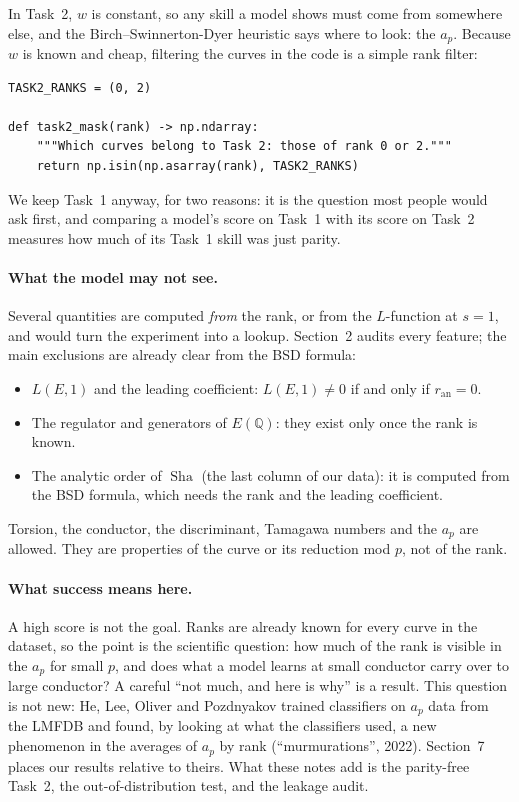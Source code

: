\documentclass[11pt]{article}
\theoremstyle{definition}
\theoremstyle{plain}
\theoremstyle{remark}
\newcommand{\Q}{\mathbb{Q}}
\renewcommand{\_}{\oldunderscore\allowbreak}
\newcommand{\file}[1]{\textcolor{blue!50!black}{\texttt{#1}}}
\DeclareMathOperator{\Sha}{Sha}
\newcommand{\codefrom}[1]{\par\smallskip\noindent{\footnotesize\textbf{From} \file{#1}}}
\begin{document}
\noindent In Task~2, $w$ is constant, so any skill a model shows must come from somewhere
else, and the Birch--Swinnerton-Dyer heuristic says where to look: the $a_p$. Because $w$ is
known and cheap, filtering the curves in the code is a simple rank filter:

\codefrom{src/eclab/tasks.py}
\begin{lstlisting}
TASK2_RANKS = (0, 2)

def task2_mask(rank) -> np.ndarray:
    """Which curves belong to Task 2: those of rank 0 or 2."""
    return np.isin(np.asarray(rank), TASK2_RANKS)
\end{lstlisting}

\noindent We keep Task~1 anyway, for two reasons: it is the question most people would ask
first, and comparing a model's score on Task~1 with its score on Task~2 measures how much of
its Task~1 skill was just parity.

\paragraph{What the model may not see.}
Several quantities are computed \emph{from} the rank, or from the $L$-function at $s=1$,
and would turn the experiment into a lookup. Section~2 audits every feature; the main
exclusions are already clear from the BSD formula:
\begin{itemize}[nosep]
  \item $L(E,1)$ and the leading coefficient: $L(E,1)\neq0$ if and only if $r_{\mathrm{an}}=0$.
  \item The regulator and generators of $E(\Q)$: they exist only once the rank is known.
  \item The analytic order of $\Sha$ (the last column of our data): it is computed from the
        BSD formula, which needs the rank and the leading coefficient.
\end{itemize}
Torsion, the conductor, the discriminant, Tamagawa numbers and the $a_p$ are allowed. They
are properties of the curve or its reduction mod $p$, not of the rank.

\paragraph{What success means here.}
A high score is not the goal. Ranks are already known for every curve in the dataset,
so the point is the scientific question: how much of the rank is visible in the $a_p$ for
small $p$, and does what a model learns at small conductor carry over to large conductor? A
careful ``not much, and here is why'' is a result. This question is not new: He, Lee, Oliver
and Pozdnyakov trained classifiers on $a_p$ data from the LMFDB and found, by looking at what
the classifiers used, a new phenomenon in the averages of $a_p$ by rank (``murmurations'', 2022).
Section~7 places our results relative to theirs. What these notes add is the parity-free
Task~2, the out-of-distribution test, and the leakage audit.
\end{document}
